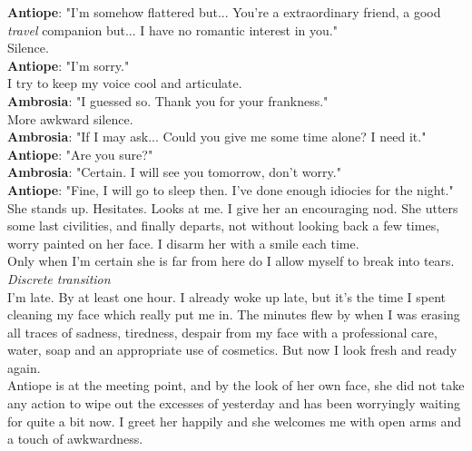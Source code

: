 \documentclass{report}
\newcommand{\dcomment}[1]{
	\emph{#1}
	\\
}
\newcommand{\speaker}[1]{
	\textbf{#1}: 
}
\begin{document}
\speaker{Antiope} "I'm somehow flattered but... You're a extraordinary friend, a good \emph{travel} companion but... I have no romantic interest in you."\\

Silence.\\

\speaker{Antiope} "I'm sorry."\\

I try to keep my voice cool and articulate.\\

\speaker{Ambrosia} "I guessed so. Thank you for your frankness."\\

More awkward silence.\\

\speaker{Ambrosia} "If I may ask... Could you give me some time alone? I need it."\\

\speaker{Antiope} "Are you sure?"\\

\speaker{Ambrosia} "Certain. I will see you tomorrow, don't worry."\\

\speaker{Antiope} "Fine, I will go to sleep then. I've done enough idiocies for the night."\\

She stands up. Hesitates. Looks at me. I give her an encouraging nod. She utters some last civilities, and finally departs, not without looking back a few times, worry painted on her face. I disarm her with a smile each time.\\

Only when I'm certain she is far from here do I allow myself to break into tears.\\

\dcomment{
	Discrete transition
}

I'm late. By at least one hour. I already woke up late, but it's the time I spent cleaning my face which really put me in. The minutes flew by when I was erasing all traces of sadness, tiredness, despair from my face with a professional care, water, soap and an appropriate use of cosmetics. But now I look fresh and ready again.\\

Antiope is at the meeting point, and by the look of her own face, she did not take any action to wipe out the excesses of yesterday and has been worryingly waiting for quite a bit now. I greet her happily and she welcomes me with open arms and a touch of awkwardness.\\
\end{document}
